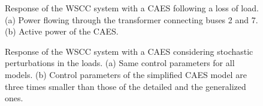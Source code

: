 \documentclass[journal, a4paper]{IEEEtran}
\begin{document}
\begin{figure}[t!]
  \centering
  \vspace{-0.4cm}
  \caption{Response of the WSCC system with a CAES following a loss of
    load. (a) Power flowing through the transformer connecting buses 2 and 7. (b)
    Active power of the CAES.}
\vspace{-0.4cm}
\end{figure}
\begin{figure}[h!]
  \centering
  \vspace{-0.4cm}
  \caption{Response of the WSCC system with a CAES considering
    stochastic perturbations in the loads.
    (a) Same control parameters for all models.
    (b) Control parameters of the simplified CAES model are three times 
		    smaller than those of the detailed and the generalized ones.}
\vspace{-0.4cm}
\end{figure}
\end{document}
